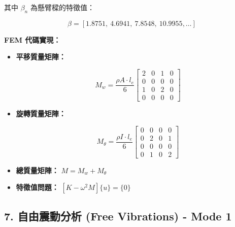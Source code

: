\documentclass[UTF8, a4paper, 12pt]{ctexart}
\begin{document}
其中 $\beta_n$ 為懸臂樑的特徵值：

\begin{equation}

    \beta = [1.8751,\ 4.6941,\ 7.8548,\ 10.9955,\dots]

\end{equation}



\textbf{FEM 代碼實現：}

\begin{itemize}

    \item \textbf{平移質量矩陣：}

    \begin{equation}

        M_w = \frac{\rho A \cdot l_e}{6} \begin{bmatrix} 2 & 0 & 1 & 0 \\ 0 & 0 & 0 & 0 \\ 1 & 0 & 2 & 0 \\ 0 & 0 & 0 & 0 \end{bmatrix}

    \end{equation}

    \item \textbf{旋轉質量矩陣：}

    \begin{equation}

        M_\theta = \frac{\rho I \cdot l_e}{6} \begin{bmatrix} 0 & 0 & 0 & 0 \\ 0 & 2 & 0 & 1 \\ 0 & 0 & 0 & 0 \\ 0 & 1 & 0 & 2 \end{bmatrix}

    \end{equation}

    \item \textbf{總質量矩陣：} $M = M_w + M_\theta$

    \item \textbf{特徵值問題：} $[K - \omega^2 M] \{u\} = \{0\}$

\end{itemize}



\subsection{7. 自由震動分析 (Free Vibrations) - Mode 1}
\end{document}
